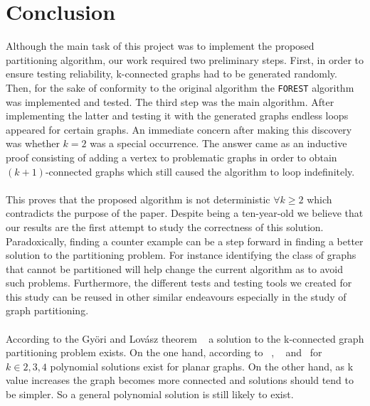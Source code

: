 \section{Conclusion}

Although the main task of this project was to implement the proposed partitioning algorithm, our work required two preliminary steps. First, in order to ensure testing reliability, k-connected graphs had to be generated randomly. Then, for the sake of conformity to the original algorithm the \verb!FOREST! algorithm was implemented and tested. The third step was the main algorithm. After implementing the latter and testing it with the generated graphs endless loops appeared for certain graphs. An immediate concern after making this discovery was whether $k=2$ was a special occurrence. The answer came as an inductive proof consisting of adding a vertex to problematic graphs in order to obtain $(k+1)$-connected graphs which still caused the algorithm to loop indefinitely. 

\paragraph{}

This proves that the proposed algorithm is not deterministic $\forall k \geq 2$ which contradicts the purpose of the paper. Despite being a ten-year-old we believe that our results are the first attempt to study the correctness of this solution. Paradoxically, finding a counter example can be a step forward in finding a better solution to the partitioning problem. For instance identifying the class of graphs that cannot be partitioned will help change the current algorithm as to avoid such problems. Furthermore, the different tests and testing tools we created for this study can be reused in other similar endeavours especially in the study of graph partitioning.

\paragraph{}

According to the Györi and Lovász theorem ~\cite{GE78} a solution to the k-connected graph partitioning problem exists. On the one hand, according to ~\cite{JS94}, ~\cite{GE78,LL77} and ~\cite{Nakano1997315}for $k \in {2, 3, 4}$ polynomial solutions exist for planar graphs. On the other hand, as k value increases the graph becomes more connected and solutions should tend to be simpler. So a general polynomial solution is still likely to exist. 

